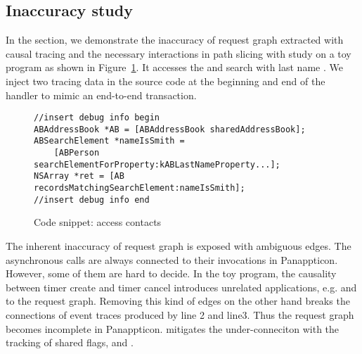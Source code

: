 \subsection{Inaccuracy study} \label{sec:toystudy}

In the section, we demonstrate the inaccuracy of request graph extracted with
causal tracing and the necessary interactions in path slicing with study on a
toy program as shown in Figure~\ref{fig:toyapp}. It accesses the 
and search with last name . We inject two tracing data in the source
code at the beginning and end of the handler to mimic an end-to-end transaction.

\begin{figure}[t]
\begin{lstlisting}
//insert debug info begin
ABAddressBook *AB = [ABAddressBook sharedAddressBook];
ABSearchElement *nameIsSmith =
	[ABPerson searchElementForProperty:kABLastNameProperty...];
NSArray *ret = [AB recordsMatchingSearchElement:nameIsSmith]; 
//insert debug info end
\end{lstlisting}
\vspace{-0.5cm}
    \caption{Code snippet: access contacts}
    \label{fig:toyapp}
\end{figure}

The inherent inaccuracy of request graph is exposed with ambiguous edges. The
asynchronous calls are always connected to their invocations in Panappticon.
However, some of them are hard to decide. In the toy program, the causality
between timer create and timer cancel introduces unrelated applications, e.g.
 and  to the request graph. Removing this kind of edges
on the other hand breaks the connections of event traces produced by line 2
and line3. Thus the request graph becomes incomplete in Panappticon. \xxx
mitigates the under-conneciton with the tracking of shared flags,  and
.

